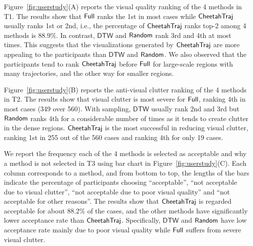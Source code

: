 


 Figure~\ref{fig:userstudy}(A) reports the visual quality ranking of the 4 methods in T1. 
The results show that $\mathsf{Full}$ ranks the 1st in most cases while $\mathsf{CheetahTraj}$ usually ranks 1st or 2nd, i.e., the percentage of $\mathsf{CheetahTraj}$ ranks top-2 among 4 methods is $88.9\%$. 
In contrast, $\mathsf{DTW}$ and $\mathsf{Random}$ rank 3rd and 4th at most times. 
This suggests that the visualizations generated by $\mathsf{CheetahTraj}$ are more appealing to the participants than $\mathsf{DTW}$ and $\mathsf{Random}$. 
We also observed that the participants tend to rank $\mathsf{CheetahTraj}$ before $\mathsf{Full}$ for large-scale regions with  many trajectories, and the other way for smaller regions. 


Figure~\ref{fig:userstudy}(B) reports the anti-visual clutter ranking of the 4 methods in T2. 
The results show that visual clutter is most severe for $\mathsf{Full}$, ranking 4th in most cases (349 over 560). With sampling, $\mathsf{DTW}$ usually rank 2nd and 3rd but $\mathsf{Random}$ ranks 4th for a considerable number of times as it tends to create clutter in the dense regions.    
$\mathsf{CheetahTraj}$ is the most successful in reducing visual clutter, ranking 1st in 255 out of the 560 cases and ranking 4th for only 19 cases.    



We report the frequency each of the 4 methods is selected as acceptable and why a method is not selected in T3 using bar chart in Figure~\ref{fig:userstudy}(C). 
Each column corresponds to a method, and from bottom to top, the lengths of the bars indicate the percentage of participants choosing ``acceptable'', ``not acceptable due to visual clutter'', ``not acceptable due to poor visual quality'' and ``not acceptable for other reasons''. 
The results show that $\mathsf{CheetahTraj}$ is regarded acceptable for about 88.2\% of the cases, and the other methods have significantly lower acceptance rate than $\mathsf{CheetahTraj}$. 
Specifically, $\mathsf{DTW}$ and $\mathsf{Random}$ have low acceptance rate mainly due to poor visual quality while $\mathsf{Full}$ suffers from severe visual clutter.





